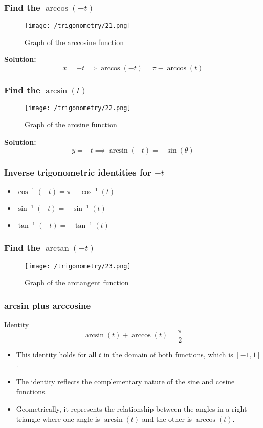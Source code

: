 \documentclass{beamer}
\begin{document}
\begin{frame}
    \frametitle{Find the \(\arccos(-t)\)}
    \begin{figure}
        \centering
        \texttt{[image: /trigonometry/21.png]}
        \caption{Graph of the arccosine function}
    \end{figure}
    \textbf{Solution:} 
    \[ x = -t \implies \arccos(-t) = \pi - \arccos(t) \] 
\end{frame}

\begin{frame}
\frametitle{Find the \(\arcsin(t)\)}
\begin{figure}
    \centering
    \texttt{[image: /trigonometry/22.png]}
    \caption{Graph of the arcsine function}
\end{figure}
\textbf{Solution:} 
\[ y = -t \implies \arcsin(-t) = -\sin(\theta) \] 
\end{frame}

\begin{frame}
    \frametitle{Inverse trigonometric identities for \(-t\)}
    \begin{itemize}
        \item \( \cos^{-1}(-t) = \pi - \cos^{-1}(t) \)
        \item \( \sin^{-1}(-t) = - \sin^{-1}(t) \)  
        \item \( \tan^{-1}(-t) = -\tan^{-1}(t) \)
    \end{itemize}
\end{frame}

\begin{frame}
    \frametitle{Find the \(\arctan(-t)\)}
    \begin{figure}
        \centering
        \texttt{[image: /trigonometry/23.png]}
        \caption{Graph of the arctangent function}
    \end{figure}
\end{frame}

\begin{frame}
    \frametitle{arcsin plus arccosine}
    \begin{block}{Identity}
        \[ \arcsin(t) + \arccos(t) = \frac{\pi}{2} \]
    \end{block}
    \begin{itemize}
        \item This identity holds for all \(t\) in the domain of both functions, which is \([-1, 1]\).
        \item The identity reflects the complementary nature of the sine and cosine functions.
        \item Geometrically, it represents the relationship between the angles in a right triangle where one angle is \(\arcsin(t)\) and the other is \(\arccos(t)\).
    \end{itemize}   
\end{frame}
\end{document}
